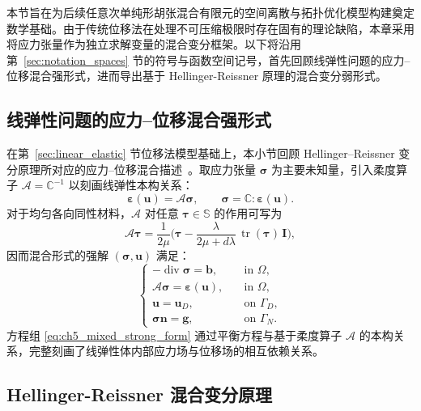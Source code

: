本节旨在为后续任意次单纯形胡张混合有限元的空间离散与拓扑优化模型构建奠定数学基础。由于传统位移法在处理不可压缩极限时存在固有的理论缺陷，本章采用将应力张量作为独立求解变量的混合变分框架。以下将沿用第~\ref{sec:notation_spaces} 节的符号与函数空间记号，首先回顾线弹性问题的应力{--}位移混合强形式，进而导出基于 Hellinger-Reissner 原理的混合变分弱形式。


\subsection{线弹性问题的应力{--}位移混合强形式}
\label{subsec:hz_strong_form}

在第~\ref{sec:linear_elastic} 节位移法模型基础上，本小节回顾 Hellinger–Reissner 变分原理所对应的应力{--}位移混合描述~\cite{brezziMixedHybridFinite1991}。取应力张量 $\boldsymbol\sigma$ 为主要未知量，引入柔度算子 $\mathcal A=\mathbb C^{-1}$ 以刻画线弹性本构关系：
\[
\boldsymbol\varepsilon(\boldsymbol u)=\mathcal A\boldsymbol\sigma,\qquad  \boldsymbol\sigma=\mathbb C:\boldsymbol\varepsilon(\boldsymbol u).
\]
对于均匀各向同性材料，$\mathcal{A}$ 对任意 $\boldsymbol{\tau}\in\mathbb{S}$ 的作用可写为
\[
\mathcal{A}\boldsymbol{\tau} =\frac{1}{2\mu}\Big(\boldsymbol{\tau} -\frac{\lambda}{2\mu+d\lambda}\,\operatorname{tr}(\boldsymbol{\tau})\,\boldsymbol{I}\Big),
\]
因而混合形式的强解 $(\boldsymbol{\sigma},\boldsymbol{u})$ 满足：
\begin{equation} 
	\begin{cases}
		-\operatorname{div}\boldsymbol{\sigma} = \boldsymbol{b}, &\quad \text{in } \Omega, \\
		\mathcal{A}\boldsymbol{\sigma} = \boldsymbol{\varepsilon}(\boldsymbol{u}), &\quad \text{in } \Omega, \\
		\boldsymbol{u} = \boldsymbol{u}_{D}, &\quad \text{on } \Gamma_D, \\
		\boldsymbol{\sigma}\boldsymbol{n} = \boldsymbol{g}, &\quad \text{on } \Gamma_N.
	\end{cases}
	\label{eq:ch5_mixed_strong_form}
\end{equation}
方程组 \eqref{eq:ch5_mixed_strong_form} 通过平衡方程与基于柔度算子 $\mathcal{A}$ 的本构关系，完整刻画了线弹性体内部应力场与位移场的相互依赖关系。


\subsection{Hellinger-Reissner 混合变分原理}
\label{subsec:hz_hr_principle}

